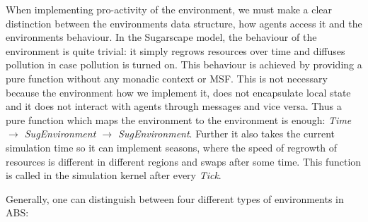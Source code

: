 When implementing pro-activity of the environment, we must make a clear distinction between the environments data structure, how agents access it and the environments behaviour. In the Sugarscape model, the behaviour of the environment is quite trivial: it simply regrows resources over time and diffuses pollution in case pollution is turned on. This behaviour is achieved by providing a pure function without any monadic context or MSF. This is not necessary because the environment how we implement it, does not encapsulate local state and it does not interact with agents through messages and vice versa. Thus a pure function which maps the environment to the environment is enough: \textit{Time $\rightarrow$ SugEnvironment $\rightarrow$ SugEnvironment}. Further it also takes the current simulation time so it can implement seasons, where the speed of regrowth of resources is different in different regions and swaps after some time. This function is called in the simulation kernel after every \textit{Tick}.

Generally, one can distinguish between four different types of environments in ABS:

